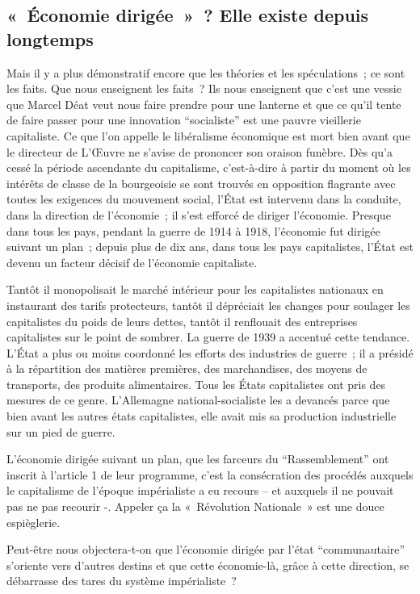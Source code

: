 \documentclass[french,twoside]{book} %
\begin{document}
\subsection[« Économie dirigée » ? Elle existe depuis longtemps]{« Économie dirigée » ? Elle existe depuis longtemps}
\noindent Mais il y a plus démonstratif encore que les théories et les spéculations ; ce sont les faits. Que nous enseignent les faits ? Ils nous enseignent que c’est une vessie que Marcel Déat veut nous faire prendre pour une lanterne et que ce qu’il tente de faire passer pour une innovation “socialiste” est une pauvre vieillerie capitaliste. Ce que l’on appelle le libéralisme économique est mort bien avant que le directeur de L’Œuvre ne s’avise de prononcer son oraison funèbre. Dès qu’a cessé la période ascendante du capitalisme, c’est-à-dire à partir du moment où les intérêts de classe de la bourgeoisie se sont trouvés en opposition flagrante avec toutes les exigences du mouvement social, l’État est intervenu dans la conduite, dans la direction de l’économie ; il s’est efforcé de diriger l’économie. Presque dans tous les pays, pendant la guerre de 1914 à 1918, l’économie fut dirigée suivant un plan ; depuis plus de dix ans, dans tous les pays capitalistes, l’État est devenu un facteur décisif de l’économie capitaliste.\par
Tantôt il monopolisait le marché intérieur pour les capitalistes nationaux en instaurant des tarifs protecteurs, tantôt il dépréciait les changes pour soulager les capitalistes du poids de leurs dettes, tantôt il renflouait des entreprises capitalistes sur le point de sombrer. La guerre de 1939 a accentué cette tendance. L’État a plus ou moins coordonné les efforts des industries de guerre ; il a présidé à la répartition des matières premières, des marchandises, des moyens de transports, des produits alimentaires. Tous les États capitalistes ont pris des mesures de ce genre. L’Allemagne national-socialiste les a devancés parce que bien avant les autres états capitalistes, elle avait mis sa production industrielle sur un pied de guerre.\par
L’économie dirigée suivant un plan, que les farceurs du “Rassemblement” ont inscrit à l’article 1 de leur programme, c’est la consécration des procédés auxquels le capitalisme de l’époque impérialiste a eu recours – et auxquels il ne pouvait pas ne pas recourir -. Appeler ça la « Révolution Nationale » est une douce espièglerie.\par
Peut-être nous objectera-t-on que l’économie dirigée par l’état “communautaire” s’oriente vers d’autres destins et que cette économie-là, grâce à cette direction, se débarrasse des tares du système impérialiste ?\par
\end{document}
